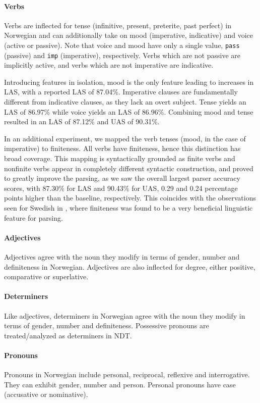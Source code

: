 \documentclass[11pt,a4paper]{article}
\begin{document}
\paragraph{Verbs}
Verbs are inflected for tense (infinitive, present, preterite, past perfect)
in Norwegian and can additionally take on mood (imperative, indicative) and
voice (active or passive). Note that voice and mood have only a single value,
\texttt{pass} (passive) and \texttt{imp} (imperative), respectively. Verbs
which are not passive are implicitly active, and verbs which are not imperative
are indicative.

Introducing features in isolation, mood is the only feature leading to
increases in LAS, with a reported LAS of 87.04\%. Imperative clauses are
fundamentally different from indicative clauses, as they lack an overt subject.
Tense yields an LAS of 86.97\% while voice yields an LAS of 86.96\%. Combining
mood and tense resulted in an LAS of 87.12\% and UAS of 90.31\%.

In an additional experiment, we mapped the verb tenses (mood, in the case of
imperative) to finiteness.  All verbs have finiteness, hence this distinction
has broad coverage.  This mapping is syntactically grounded as finite verbs and
nonfinite verbs appear in completely different syntactic construction, and
proved to greatly improve the parsing, as we saw the overall largest parser
accuracy scores, with 87.30\% for LAS and 90.43\% for UAS, 0.29 and 0.24
percentage points higher than the baseline, respectively.  This coincides with
the observations seen for Swedish in , where finiteness was found
to be a very beneficial linguistic feature for parsing.

\paragraph{Adjectives}
Adjectives agree with the noun they modify in terms of gender, number and
definiteness in Norwegian. Adjectives are also inflected for degree, either
positive, comparative or superlative.


\paragraph{Determiners}
Like adjectives, determiners in Norwegian agree with the noun they modify in
terms of gender, number and definiteness. Possessive pronouns are
treated/analyzed as determiners in NDT.

\paragraph{Pronouns}
Pronouns in Norwegian include personal, reciprocal, reflexive and
interrogative. They can exhibit gender, number and person. Personal pronouns
have case (accusative or nominative).
\end{document}

